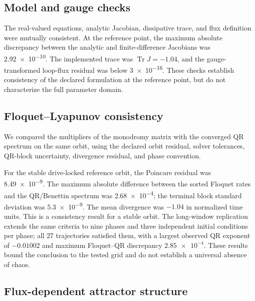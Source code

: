 \documentclass[aip,cha,reprint]{revtex4-2}
\newcommand{\Tr}{\operatorname{Tr}}
\begin{document}
\subsection{Model and gauge checks}

The real-valued equations, analytic Jacobian, dissipative trace, and flux definition
were mutually consistent. At the reference point, the maximum absolute discrepancy
between the analytic and finite-difference Jacobians was \num{2.92e-10}. The
implemented trace was $\Tr J=-\num{1.04}$, and the gauge-transformed loop-flux
residual was below \num{3e-16}. These checks establish consistency of the declared
formulation at the reference point, but do not characterize the full parameter domain.

\subsection{Floquet--Lyapunov consistency}

We compared the multipliers of the monodromy matrix with the converged QR spectrum
on the same orbit, using the declared orbit residual, solver tolerances, QR-block
uncertainty, divergence residual, and phase convention.

For the stable drive-locked reference orbit, the Poincare residual was
\num{8.49e-9}. The maximum absolute difference between the sorted Floquet rates
and the QR/Benettin spectrum was \num{2.68e-4}; the terminal block standard
deviation was \num{5.3e-9}. The mean divergence was $-\num{1.04}$ in normalized
time units. This is a consistency result for a stable orbit. The long-window
replication extends the same criteria to nine phases and three independent initial
conditions per phase; all 27 trajectories satisfied them, with a largest observed QR exponent of
$-\num{0.01002}$ and maximum Floquet--QR discrepancy $\num{2.85e-4}$. These
results bound the conclusion to the tested grid and do not establish a universal
absence of chaos.

\subsection{Flux-dependent attractor structure}
\end{document}
